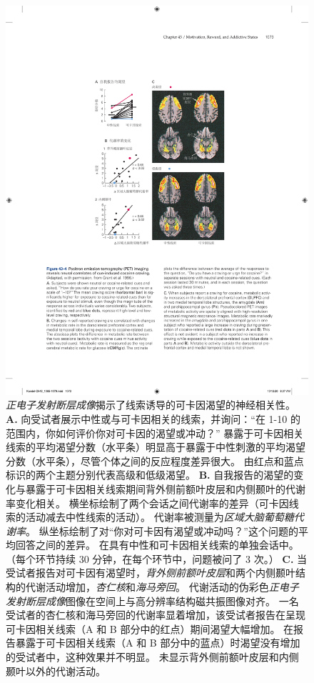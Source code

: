 \begin{figure}[htbp]
	\centering
	\includegraphics[width=0.7\linewidth]{chap43/fig_43_4}
	\caption{\textit{正电子发射断层成像}揭示了线索诱导的可卡因渴望的神经相关性\cite{grant1996activation}。
		\textbf{A.} 向受试者展示中性或与可卡因相关的线索，并询问：“在 1-10 的范围内，你如何评价你对可卡因的渴望或冲动？” 
		暴露于可卡因相关线索的平均渴望分数（水平条）明显高于暴露于中性刺激的平均渴望分数（水平条），尽管个体之间的反应程度差异很大。
		由红点和蓝点标识的两个主题分别代表高级和低级渴望。
		\textbf{B.} 自我报告的渴望的变化与暴露于可卡因相关线索期间背外侧前额叶皮层和内侧颞叶的代谢率变化相关。
		横坐标绘制了两个会话之间代谢率的差异（可卡因线索的活动减去中性线索的活动）。
		代谢率被测量为\textit{区域大脑葡萄糖代谢率}。
		纵坐标绘制了对“你对可卡因有渴望或冲动吗？”这个问题的平均回答之间的差异。
		在具有中性和可卡因相关线索的单独会话中。
		（每个环节持续 30 分钟，在每个环节中，问题被问了 3 次。）
		\textbf{C.} 当受试者报告对可卡因有渴望时，\textit{背外侧前额叶皮层}和两个内侧颞叶结构的代谢活动增加，\textit{杏仁核}和\textit{海马旁回}。
		代谢活动的伪彩色\textit{正电子发射断层成像}图像在空间上与高分辨率结构磁共振图像对齐。
		一名受试者的杏仁核和海马旁回的代谢率显着增加，该受试者报告在呈现可卡因相关线索（A 和 B 部分中的红点）期间渴望大幅增加。
		在报告暴露于可卡因相关线索（A 和 B 部分中的蓝点）时渴望没有增加的受试者中，这种效果并不明显。
		未显示背外侧前额叶皮层和内侧颞叶以外的代谢活动。}
	\label{fig:43_4}
\end{figure}


